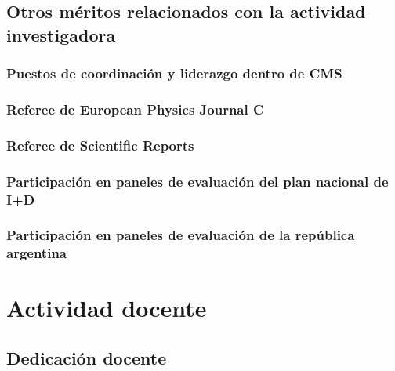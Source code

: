 \documentclass[a4paper, 11pt, twoside, openright]{report}
\begin{document}
\section{Otros méritos relacionados con la actividad investigadora}

\subsection{Puestos de coordinación y liderazgo dentro de CMS}


\subsection{Referee de European Physics Journal C}



\subsection{Referee de Scientific Reports}


\subsection{Participación en paneles de evaluación del plan nacional de I+D}


\subsection{Participación en paneles de evaluación de la república argentina}


\chapter{Actividad docente}

\section{Dedicación docente}
\end{document}
